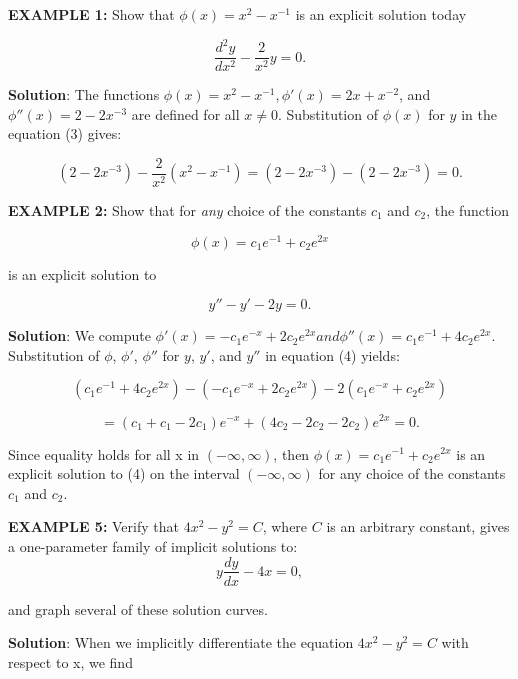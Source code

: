 \documentclass[11pt]{article}
\begin{document}
\textbf{EXAMPLE 1:} Show that $\phi(x) = x^{2} - x^{-1}$ is an explicit solution today

\[
    \frac{d^{2}y}{dx^{2}} - \frac{2}{x^{2}}y = 0.
\]

\textbf{Solution}: The functions $\phi(x) = x^{2} - x^{-1}, \phi'(x) = 2x + x^{-2}$, and $\phi''(x) = 2 - 2x^{-3}$ are defined for all
$x \not = 0$. Substitution of $\phi(x)$ for $y$ in the equation (3) gives:

\[
    (2-2x^{-3})- \frac{2}{x^{2}}(x^{2}-x^{-1}) =  (2-2x^{-3}) - (2-2x^{-3}) = 0.
\]

\textbf{EXAMPLE 2:} Show that for \textit{any} choice of the constants $c_1$ and $c_2$, the function

\[
    \phi(x) = c_{1}e^{-1} + c_2e^{2x}
\]

is an explicit solution to

\[
    y'' -  y' -2y = 0. \tag{4}
\]

\textbf{Solution}: We compute $\phi'(x) = -c_1e^{-x} + 2c_2e^{2x} and \phi''(x) = c_1e^{-1}+4c_2e^{2x}.$
Substitution of $\phi$, $\phi'$, $\phi''$ for $y$, $y'$, and $y''$ in equation (4) yields:

\[
    (c_1e^{-1}+4c_2e^{2x}) - (-c_1e^{-x} + 2c_2e^{2x}) - 2(c_1e^{-x}+c_2e^{2x})
\]

\[
    = (c_1 + c_1 -2c_1)e^{-x} + (4c_2-2c_2-2c_2)e^{2x} = 0.
\]

Since equality holds for all x in $(- \infty, \infty)$, then $\phi(x) = c_1e^{-1} + c_2e^{2x}$ is an explicit solution to (4) on the interval $(- \infty, \infty)$ for any choice of the constants $c_1$ and $c_2$.

\newpage


\textbf{EXAMPLE 5:} Verify that $4x^{2}-y^{2}=C$, where $C$ is an arbitrary constant, gives a one-parameter family of implicit solutions to:
\[
    y \frac{dy}{dx} - 4x = 0 \tag{9},
\]

and graph several of these solution curves.

\textbf{Solution}: When we implicitly differentiate the equation $4x^{2} - y^{2} = C$ with respect to x, we find
\end{document}
